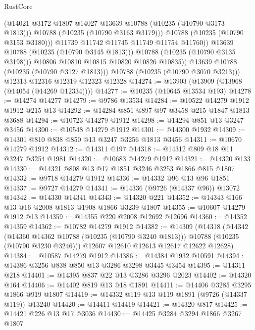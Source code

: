 \begin{lexlean}{RustCore}
\begin{coremodule}
                        (@14021 @3172 @1807 @14027 @13639 @10788 (@10235 (@10790 @3173 @1813)))
                        @10788
                        (@10235 (@10790 @3163 @3179)))
                      @10788
                      (@10235 (@10790 @3153 @3180)))
                    @11739
                    @11742
                    @11745
                    @11749
                    @11754
                    @11760))
                @13639
                @10788
                (@10235 (@10790 @3145 @1813)))
              @10788
              (@10235 (@10790 @3135 @3198)))
            @10806
            @10810
            @10815
            @10820
            @10826
            @10835))
        @13639
        @10788
        (@10235 (@10790 @3127 @1813)))
      @10788
      (@10235 (@10790 @3070 @3213)))
    @12313
    @12316
    @12319
    @12323
    @12328
@14274 := @13903 (@13909 (@13968 (@14054 (@14269 @12334))))
@14277 := @10235 (@10645 @13534 @193)
@14278 := @14274 @14277
@14279 := @9786 @13534
@14284 := @10522 @14279 @1912 @1912 @215 @13
@14292 := @14284 @851 @897 @97 @3458 @215 @1847 @1813 @3688
@14294 := @10723 @14279 @1912
@14298 := @14294 @851 @13 @3247 @3456
@14300 := @10548 @14279 @1912
@14301 := @14300 @1932
@14309 := @14301 @810 @838 @850 @13 @3247 @3256 @1813 @3456
@14311 := @10670 @14279 @1912
@14312 := @14311 @197
@14318 := @14312 @809 @18 @11 @3247 @3254 @1981
@14320 := @10683 @14279 @1912
@14321 := @14320 @133
@14330 := @14321 @808 @13 @17 @1851 @3246 @3253 @1866 @815 @1807
@14332 := @9718 @14279 @1912
@14336 := @14332 @96 @13 @96 @1851
@14337 := @9727 @14279
@14341 := @14336 (@9726 (@14337 @96)) @13072
@14342 := @14330 @14341
@14343 := @14320 @221
@14352 := @14343 @166 @13 @16 @2008 @1813 @1908 @1866 @3239 @1807
@14355 := @10607 @14279 @1912 @13
@14359 := @14355 @220 @2008 @12692 @12696
@14360 := @14352 @14359
@14362 := @10782 @14279 @1912
@14382 := @14309
    (@14318
      (@14342
        (@14360 @14362 @10788 (@10235 (@10790 @3240 @1813)))
        @10788
        (@10235 (@10790 @3230 @3246)))
      @12607
      @12610
      @12613
      @12617
      @12622
      @12628)
@14384 := @10587 @14279 @1912
@14386 := @14384 @1932 @10591
@14394 := @14386 @3256 @838 @850 @13 @3286 @3298 @3445 @3454
@14395 := @14311 @218
@14401 := @14395 @837 @22 @13 @3286 @3296 @2023
@14402 := @14320 @164
@14406 := @14402 @819 @13 @18 @1891
@14411 := @14406 @3285 @3295 @1866 @919 @1807
@14419 := @14332 @119 @13 @119 @1891 (@9726 (@14337 @119)) @13240
@14420 := @14411 @14419
@14421 := @14320 @817
@14425 := @14421 @226 @13 @17 @3036
@14430 := @14425 @3284 @3294 @1866 @3267 @1807

\end{coremodule}
\end{lexlean}
